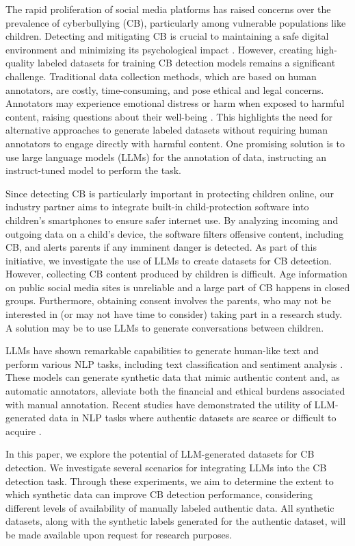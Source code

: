 The rapid proliferation of social media platforms has raised concerns over the prevalence of cyberbullying (CB), particularly among vulnerable populations like children. %
Detecting and mitigating CB is crucial to maintaining a safe digital environment and minimizing its psychological impact \cite{arif-etal-2024-impact}. However, creating high-quality labeled datasets for training CB detection models remains a significant challenge. Traditional data collection methods, which are based on human annotators, are costly, time-consuming, and pose ethical and legal concerns. Annotators may experience emotional distress or harm when exposed to harmful content, raising questions about their well-being \cite{alemadi-Zaghouani-2024-emotional}. This highlights the need for alternative approaches to generate labeled datasets without requiring human annotators to engage directly with harmful content. One promising solution is to use large language models (LLMs) for the annotation of data, instructing an instruct-tuned model to perform the task.

Since detecting CB is particularly important in protecting children online, our industry partner aims to integrate built-in child-protection software into children's smartphones to ensure safer internet use. By analyzing incoming and outgoing data on a child's device, the software filters offensive content, including CB, and alerts parents if any imminent danger is detected. As part of this initiative, we investigate the use of LLMs to create datasets for CB detection.
However, collecting CB content produced by children is difficult. Age information on public social media sites is unreliable and a large part of CB happens in closed groups. Furthermore, obtaining consent involves the parents, who may not be interested in (or may not have time to consider) taking part in a research study.
A solution may be to use LLMs to generate conversations between children.

LLMs have shown remarkable capabilities to generate human-like text and perform various NLP tasks, including text classification and sentiment analysis \cite{brown-etal-2020-language}. These models can generate synthetic data that mimic authentic content and, as automatic annotators, alleviate both the financial and ethical burdens associated with manual annotation. Recent studies have demonstrated the utility of LLM-generated data in NLP tasks where authentic datasets are scarce or difficult to acquire \cite{li-etal-2023-synthetic, he-etal-2022-generate, ghanadian-etal-2024-socially, yoo-etal-2021-gpt3mix}.

In this paper, we explore the potential of LLM-generated datasets for CB detection. We investigate several scenarios for integrating LLMs into the CB detection task. Through these experiments, we aim to determine the extent to which synthetic data can improve CB detection performance, considering different levels of availability of manually labeled authentic data. All synthetic datasets, along with the synthetic labels generated for the authentic dataset, will be made available upon request for research purposes.